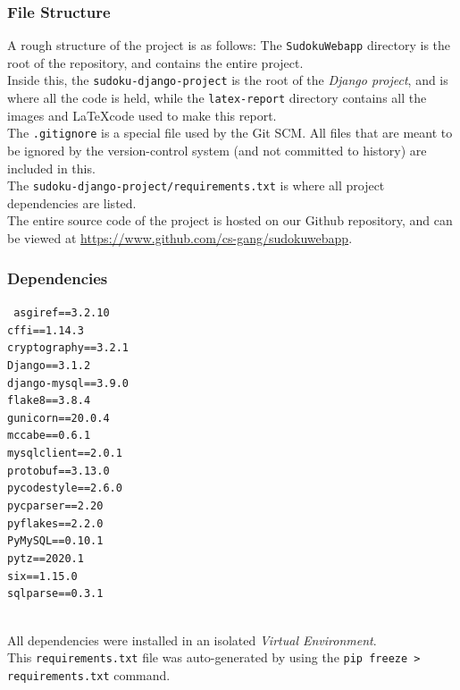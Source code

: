 \documentclass[12pt, a4paper]{report}
\newcommand{\code}[1]{\colorbox{light-gray}{\texttt{#1}}}
\begin{document}
    \subsubsection{File Structure}
    A rough structure of the project is as follows:
    \vspace{0.5cm}
    The \verb|SudokuWebapp| directory is the root of the repository, and contains the entire project.\\ Inside this, the \verb|sudoku-django-project| is the root of the \emph{Django project}, and is where all the code is held, while the \verb|latex-report| directory contains all the images and \LaTeX code used to make this report.\\
    The \verb|.gitignore| is a special file used by the Git SCM. All files that are meant to be ignored by the version-control system (and not committed to history) are included in this. \\
    The \verb|sudoku-django-project/requirements.txt| is where all project dependencies are listed.\\
    The entire source code of the project is hosted on our Github repository, and can be viewed at \url{https://www.github.com/cs-gang/sudokuwebapp}.
    
    \subsubsection{Dependencies}
    \texttt{%
    asgiref==3.2.10 \\
    cffi==1.14.3 \\
    cryptography==3.2.1 \\
    Django==3.1.2 \\
    django-mysql==3.9.0 \\
    flake8==3.8.4 \\
    gunicorn==20.0.4 \\
    mccabe==0.6.1 \\
    mysqlclient==2.0.1 \\
    protobuf==3.13.0 \\
    pycodestyle==2.6.0 \\
    pycparser==2.20 \\
    pyflakes==2.2.0 \\
    PyMySQL==0.10.1 \\
    pytz==2020.1 \\
    six==1.15.0 \\
    sqlparse==0.3.1 \\
    }
    \\
    \begin{footnotesize}
    All dependencies were installed in an isolated \emph{Virtual Environment}.\\
    This \verb|requirements.txt| file was auto-generated by using the \code{pip freeze > requirements.txt} command. 
    \end{footnotesize}
    
\end{document}
